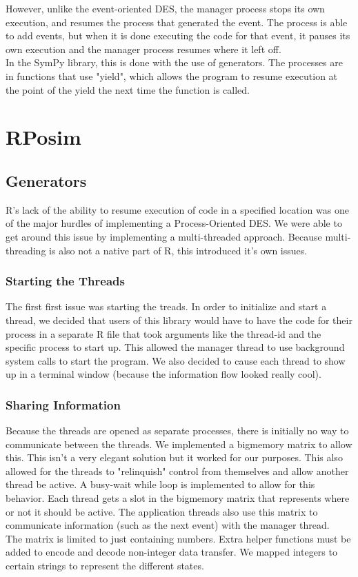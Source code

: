 \documentclass[fleqn]{article}
\begin{document}
 However, unlike the event-oriented DES, the manager process stops its own execution, and resumes the process that generated the event. The process is able to add events, but when it is done executing the code for that event, it pauses its own execution and the manager process resumes where it left off.\\
 
 In the SymPy library, this is done with the use of generators. The processes are in functions that use "yield", which allows the program to resume execution at the point of the yield the next time the function is called.
 
\section{RPosim}
\subsection{Generators}
R's lack of the ability to resume execution of code in a specified location was one of the major hurdles of implementing a Process-Oriented DES. We were able to get around this issue by implementing a multi-threaded approach. Because multi-threading is also not a native part of R, this introduced it's own issues.
\subsubsection{Starting the Threads} The first first issue was starting the treads. In order to initialize and start a thread, we decided that users of this library would have to have the code for their process in a separate R file that took arguments like the thread-id and the specific process to start up. This allowed the manager thread to use background system calls to start the program. We also decided to cause each thread to show up in a terminal window (because the information flow looked really cool).
\subsubsection{Sharing Information} Because the threads are opened as separate processes, there is initially no way to communicate between the threads. We implemented a bigmemory matrix to allow this. This isn't a very elegant solution but it worked for our purposes. This also allowed for the threads to "relinquish" control from themselves and allow another thread be active. A busy-wait while loop is implemented to allow for this behavior. Each thread gets a slot in the bigmemory matrix that represents where or not it should be active. The application threads also use this matrix to communicate information (such as the next event) with the manager thread.\\
The matrix is limited to just containing numbers. Extra helper functions must be added to encode and decode non-integer data transfer. We mapped integers to certain strings to represent the different states.
\end{document}
